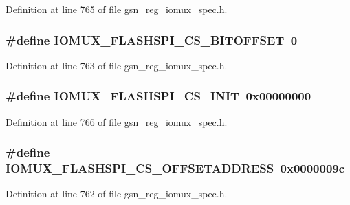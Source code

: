 Definition at line 765 of file gsn\_\-reg\_\-iomux\_\-spec.h.

\hypertarget{a00560_aaaf405eefc0a57d5dd996474009f7345}{
\subsubsection[{IOMUX\_\-FLASHSPI\_\-CS\_\-BITOFFSET}]{\setlength{\rightskip}{0pt plus 5cm}\#define IOMUX\_\-FLASHSPI\_\-CS\_\-BITOFFSET~0}}
\label{a00560_aaaf405eefc0a57d5dd996474009f7345}


Definition at line 763 of file gsn\_\-reg\_\-iomux\_\-spec.h.

\hypertarget{a00560_a12d2320efec14afc3efbf240f8fca57d}{
\subsubsection[{IOMUX\_\-FLASHSPI\_\-CS\_\-INIT}]{\setlength{\rightskip}{0pt plus 5cm}\#define IOMUX\_\-FLASHSPI\_\-CS\_\-INIT~0x00000000}}
\label{a00560_a12d2320efec14afc3efbf240f8fca57d}


Definition at line 766 of file gsn\_\-reg\_\-iomux\_\-spec.h.

\hypertarget{a00560_a3a0f4cacd502c59384c83020065d4781}{
\subsubsection[{IOMUX\_\-FLASHSPI\_\-CS\_\-OFFSETADDRESS}]{\setlength{\rightskip}{0pt plus 5cm}\#define IOMUX\_\-FLASHSPI\_\-CS\_\-OFFSETADDRESS~0x0000009c}}
\label{a00560_a3a0f4cacd502c59384c83020065d4781}


Definition at line 762 of file gsn\_\-reg\_\-iomux\_\-spec.h.

